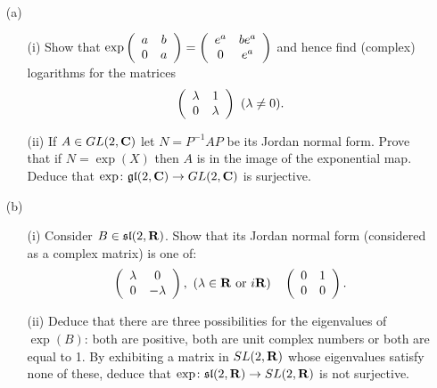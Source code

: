 \documentclass[12pt]{article}
\begin{document}
\iffalse
\begin{answer}
\begin{itemize}
\item $Sp(2n,\RR)\cap O(2n)\subset GL(n,\CC)$: If $A^TJA=J$ and $A^TA=1$ then $A^{-1}JA=J$ so $JA=AJ$.
\item $GL(n,\CC)\cap O(n)\subset Sp(2n,\RR)$: If $AJ=JA$ and $A^TA=1$ then $A^TJA=A^TAJ=J$.
\item $GL(n,\CC)\cap Sp(2n,\RR)\subset O(2n)$: If $AJ=JA$ and $A^TJA=J$ then $A^TAJ=A^TJA=J$ so $A^TA=1$.
\end{itemize}
Therefore the three pairwise intersections equal the triple intersection. To see that the triple intersection equals $U(n)$, note that the conjugate transpose of a complex $n$-by-$n$ matrix considered as a real $2n$-by-$2n$ matrix is the real transpose. Hence $A^TA=1$ implies that if $A\in GL(n,\CC)$ then $A$ is unitary.
\end{answer}
\newpage
\fi

\bigskip


\begin{question}\ \\
\begin{enumerate}
\item[(a)]
\begin{enumerate}
\item[(i)] Show that $\exp\left(\begin{array}{cc}a & b\\ 0 & a\end{array}\right)=\left(\begin{array}{cc}e^a & be^a\\ 0 & e^a\end{array}\right)$ and hence find (complex) logarithms for the matrices
\[\left(\begin{array}{cc}\lambda & 1\\ 0 & \lambda\end{array}\right)\ (\lambda\neq 0).\]
\item[(ii)] If $A\in GL(2,\mathbf{C})$ let $N=P^{-1}AP$ be its Jordan normal form. Prove that if $N=\exp(X)$ then $A$ is in the image of the exponential map. Deduce that $\exp\colon\mathfrak{gl}(2,\mathbf{C})\to GL(2,\mathbf{C})$ is surjective.
\end{enumerate}
\item[(b)]
\begin{enumerate}
\item[(i)] Consider $B\in \mathfrak{sl}(2,\mathbf{R})$. Show that its Jordan normal form (considered as a complex matrix) is one of:
\[\matr{\lambda}{0}{0}{-\lambda},\ (\lambda\in\RR\mbox{ or }i\RR)\quad\matr{0}{1}{0}{0}.\]
\item[(ii)] Deduce that there are three possibilities for the eigenvalues of $\exp(B)$: both are positive, both are unit complex numbers or both are equal to 1. By exhibiting a matrix in $SL(2,\mathbf{R})$ whose eigenvalues satisfy none of these, deduce that $\exp\colon\mathfrak{sl}(2,\mathbf{R})\to SL(2,\mathbf{R})$ is not surjective.
\end{enumerate}
\end{enumerate}
\end{question}
\end{document}
